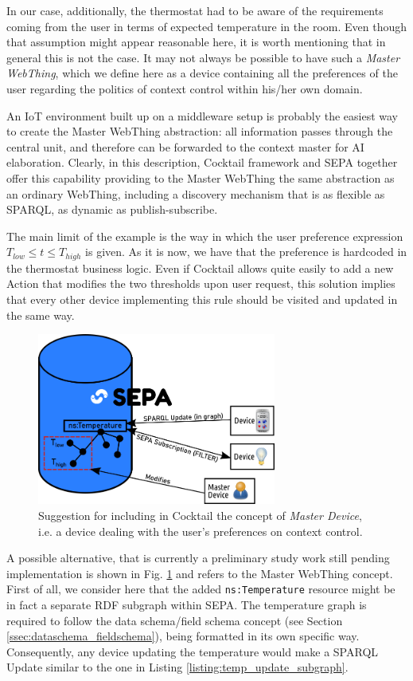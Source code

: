 In our case, additionally, the thermostat had to be aware of the requirements coming from the user in terms of expected temperature in the room. Even though that assumption might appear reasonable here, it is worth mentioning that in general this is not the case. It may not always be possible to have such a \textit{Master WebThing}, which we define here as a device containing all the preferences of the user regarding the politics of context control within his/her own domain. 

An IoT environment built up on a middleware setup is probably the easiest way to create the Master WebThing abstraction: all information passes through the central unit, and therefore can be forwarded to the context master for AI elaboration. Clearly, in this description, Cocktail framework and SEPA together offer this capability providing to the Master WebThing the same abstraction as an ordinary WebThing, including a discovery mechanism that is as flexible as SPARQL, as dynamic as publish-subscribe.

The main limit of the example is the way in which the user preference expression $T_{low} \le t \le T_{high}$ is given. As it is now, we have that the preference is hardcoded in the thermostat business logic. Even if Cocktail allows quite easily to add a new Action that modifies the two thresholds upon user request, this solution implies that every other device implementing this rule should be visited and updated in the same way.
\begin{figure}
\centering
\includegraphics[width=0.7\textwidth]{preferences.png}
\caption{Suggestion for including in Cocktail the concept of \textit{Master Device}, i.e. a device dealing with the user's preferences on context control.}
\label{fig:preferences}
\end{figure}

A possible alternative, that is currently a preliminary study work still pending implementation is shown in Fig. \ref{fig:preferences} and refers to the Master WebThing concept. First of all, we consider here that the added \texttt{ns:Temperature} resource might be in fact a separate RDF subgraph within SEPA. The temperature graph is required to follow the data schema/field schema concept (see Section \ref{ssec:dataschema_fieldschema}), being formatted in its own specific way. Consequently, any device updating the temperature would make a SPARQL Update similar to the one in Listing \ref{listing:temp_update_subgraph}.

